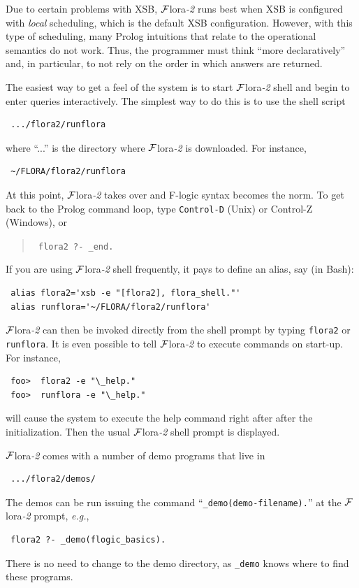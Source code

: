 \documentclass[11pt]{article}
\newcommand{\FLORA}{{\mbox{\sc ${\cal F}${lora}\rm\emph{-2}}}\xspace}
\newcommand{\fl}{\mbox{F-logic}\xspace}
\begin{document}
Due to certain problems with XSB, \FLORA runs best when XSB is configured
with \emph{local} scheduling, which is the default XSB configuration.
However, with this type of scheduling, many Prolog intuitions that relate
to the operational semantics do not work. Thus, the programmer must think
``more declaratively'' and, in particular, to not rely on the 
order in which answers are returned.


\label{runflora-page}
The easiest way to get a feel of the system
is to start \FLORA shell and begin to enter queries interactively.
The simplest way to do this is to use the shell script
\begin{verbatim}
 .../flora2/runflora  
\end{verbatim}
where ``...'' is the directory where \FLORA is downloaded. For instance,
\begin{verbatim}
 ~/FLORA/flora2/runflora  
\end{verbatim}

At this point, \FLORA takes over and \fl syntax becomes the
norm. To get back to the Prolog command loop, type {\tt Control-D} 
(Unix) or Control-Z (Windows), or 
\begin{quote}
  \tt
flora2 ?- \_end.  
\end{quote}

\noindent
If you are using \FLORA shell frequently, it pays to define an alias, say
(in Bash):
\begin{verbatim}
 alias flora2='xsb -e "[flora2], flora_shell."'
 alias runflora='~/FLORA/flora2/runflora'
\end{verbatim}
\FLORA can then be invoked directly from the shell prompt by typing
{\tt flora2} or {\tt runflora}. 
It is even possible to tell \FLORA to execute commands on start-up.
For instance, 
\begin{verbatim}
 foo>  flora2 -e "\_help."
 foo>  runflora -e "\_help."
\end{verbatim}
will cause the system to execute the help command right after after the
initialization. Then the usual \FLORA shell prompt is displayed.

\noindent
\FLORA comes with a number of demo programs that live in
\begin{verbatim}
 .../flora2/demos/
\end{verbatim}
The demos can be run issuing the command
``\verb|_demo(demo-filename).|''
at the \FLORA prompt, {\it e.g.},
\begin{verbatim}
 flora2 ?- _demo(flogic_basics).
\end{verbatim}
There is no need to change to the demo directory, as {\tt \_demo} knows
where to find these programs.
\end{document}
